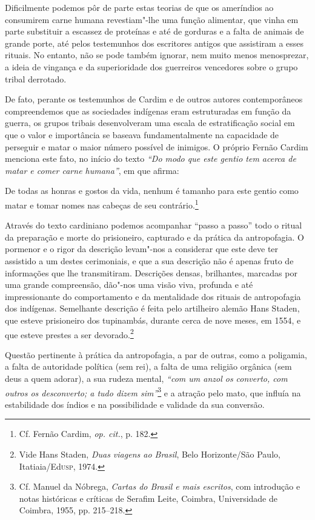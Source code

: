 Dificilmente podemos pôr de parte estas teorias de que os ameríndios
ao consumirem carne humana revestiam"-lhe uma função alimentar, que
vinha em parte substituir a escassez de proteínas e até de gorduras e a
falta de animais de grande porte, até pelos testemunhos dos escritores
antigos que assistiram a esses rituais. No entanto, não se pode também
ignorar, nem muito menos menosprezar, a ideia de vingança e da
superioridade dos guerreiros vencedores sobre o grupo tribal derrotado.

De fato, perante os testemunhos de Cardim e de outros autores
contemporâneos compreendemos que as sociedades indígenas eram
estruturadas em função da guerra, os grupos tribais desenvolveram uma
escala de estratificação social em que o valor e importância se baseava
fundamentalmente na capacidade de perseguir e matar o maior número
possível de inimigos. O próprio Fernão Cardim menciona este fato, no
início do texto \textit{``Do modo que este gentio tem
acerca de matar e comer carne humana''}, em que afirma:

\begin{hedraquote}
De todas as honras e gostos da vida, nenhum é tamanho para este gentio
como matar e tomar nomes nas cabeças de seu contrário.\footnote{ Cf. Fernão 
Cardim, \textit{op. cit.}, p. 182.} 
\end{hedraquote}

Através do texto cardiniano podemos acompanhar ``passo a passo'' todo
o ritual da preparação e morte do prisioneiro, capturado e da prática
da antropofagia. O pormenor e o rigor da descrição levam"-nos a
considerar que este deve ter assistido a um destes cerimoniais, e que a
sua descrição não é apenas fruto de informações que lhe transmitiram.
Descrições densas, brilhantes, marcadas por uma grande compreensão,
dão"-nos uma visão viva, profunda e até impressionante do comportamento
e da mentalidade dos rituais de antropofagia dos indígenas. Semelhante
descrição é feita pelo artilheiro alemão Hans Staden, que esteve
prisioneiro dos tupinambás, durante cerca de nove meses, em 1554, e que
esteve prestes a ser devorado.\footnote{ Vide Hans Staden,
\textit{Duas viagens ao Brasil}, Belo Horizonte/São Paulo, Itatiaia/Ed\textsc{usp}, 1974.} 

Questão pertinente à prática da antropofagia, a par de outras, como a
poligamia, a falta de autoridade política (sem rei), a falta de uma
religião orgânica (sem deus a quem adorar), a sua rudeza mental,
\textit{``com um anzol os converto, com outros os desconverto; a tudo
dizem sim''}\footnote{ Cf. Manuel da Nóbrega, \textit{Cartas do
Brasil e mais escritos}, com introdução e notas históricas e críticas
de Serafim Leite, Coimbra, Universidade de Coimbra, 1955, pp. 215--218.}
e a atração pelo mato, que influía na estabilidade dos índios e na
possibilidade e validade da sua conversão. 

